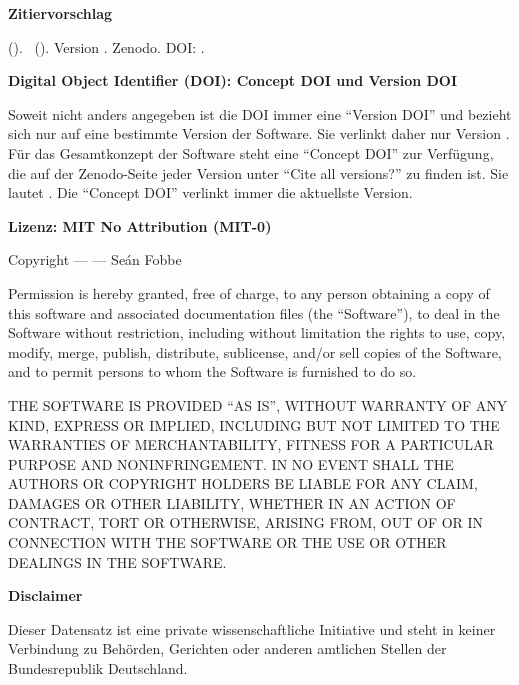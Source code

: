 \textbf{Zitiervorschlag}

\emph{\projectauthor} (\the\year ). \softwaretitle\ (\softwareshort ). Version \version . Zenodo. DOI: \softwareversiondoi .


\vspace{0.5cm}

\textbf{Digital Object Identifier (DOI): Concept DOI und Version DOI}

Soweit nicht anders angegeben ist die DOI immer eine \enquote{Version DOI}  und bezieht sich nur auf eine bestimmte Version der Software. Sie verlinkt daher nur Version \version . Für das Gesamtkonzept der Software steht eine \enquote{Concept DOI} zur Verfügung, die auf der Zenodo-Seite jeder Version unter \enquote{Cite all versions?} zu finden ist. Sie lautet \softwareconceptdoi . Die \enquote{Concept DOI} verlinkt immer die aktuellste Version.

\vspace{0.5cm}


\textbf{Lizenz: MIT No Attribution (MIT-0)}

Copyright --- \the\year --- Seán Fobbe

Permission is hereby granted, free of charge, to any person obtaining a copy of this software and associated documentation files (the \enquote{Software}), to deal in the Software without restriction, including without limitation the rights to use, copy, modify, merge, publish, distribute, sublicense, and/or sell copies of the Software, and to permit persons to whom the Software is furnished to do so.

 
THE SOFTWARE IS PROVIDED \enquote{AS IS}, WITHOUT WARRANTY OF ANY KIND, EXPRESS OR IMPLIED, INCLUDING BUT NOT LIMITED TO THE WARRANTIES OF MERCHANTABILITY, FITNESS FOR A PARTICULAR PURPOSE AND NONINFRINGEMENT. IN NO EVENT SHALL THE AUTHORS OR COPYRIGHT HOLDERS BE LIABLE FOR ANY CLAIM, DAMAGES OR OTHER LIABILITY, WHETHER IN AN ACTION OF CONTRACT, TORT OR OTHERWISE, ARISING FROM, OUT OF OR IN CONNECTION WITH THE SOFTWARE OR THE USE OR OTHER DEALINGS IN THE SOFTWARE. 



\vspace{0.5cm}



\textbf{Disclaimer} 

Dieser Datensatz ist eine private wissenschaftliche Initiative und steht in keiner Verbindung zu Behörden, Gerichten oder anderen amtlichen Stellen der Bundesrepublik Deutschland.




\newpage